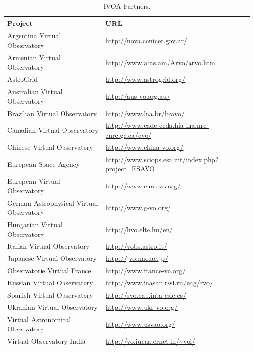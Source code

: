 \begin{table}%
\centering
\begin{tabular}{|p{7cm}|p{7cm}|}
	\hline
	\textbf{Project} & \textbf{URL} \\
	\hline
	Argentina Virtual Observatory & \url{http://nova.conicet.gov.ar/} \\
	\hline
	Armenian Virtual Observatory & \url{http://www.aras.am/Arvo/arvo.htm} \\
	\hline
	AstroGrid & \url{http://www.astrogrid.org/} \\
	\hline
	Australian Virtual Observatory & \url{http://aus-vo.org.au/} \\
	\hline
	Brazilian Virtual Observatory & \url{http://www.lna.br/bravo/} \\
	\hline
	Canadian Virtual Observatory &
    \url{http://www.cadc-ccda.hia-iha.nrc-cnrc.gc.ca/cvo/} \\
	\hline
    Chinese Virtual Observatory &
    \url{http://www.china-vo.org/} \\
	\hline
    European Space Agency &
    \url{http://www.sciops.esa.int/index.php?project=ESAVO} \\
	\hline
	European Virtual Observatory & \url{http://www.euro-vo.org/} \\
	\hline
	German Astrophysical Virtual Observatory & \url{http://www.g-vo.org/} \\
	\hline
	Hungarian Virtual Observatory & \url{http://hvo.elte.hu/en/} \\
	\hline
	Italian Virtual Observatory & \url{http://vobs.astro.it/} \\
	\hline
	Japanese Virtual Observatory & \url{http://jvo.nao.ac.jp/}\\
	\hline
	Observatorie Virtual France & \url{http://www.france-vo.org/} \\
	\hline
	Russian Virtual Observatory & \url{http://www.inasan.rssi.ru/eng/rvo/} \\
	\hline
	Spanish Virtual Observatory & \url{http://svo.cab.inta-csic.es/} \\
	\hline
	Ukranian Virtual Observatory & \url{http://www.ukr-vo.org/} \\
	\hline
	Virtual Astronomical Observatory & \url{http://www.usvao.org/} \\
	\hline
	Virtual Observatory India & \url{http://vo.iucaa.ernet.in/~voi/} \\
	\hline
\end{tabular}
\caption{IVOA Partners.}
\label{table:partners}
\end{table}

